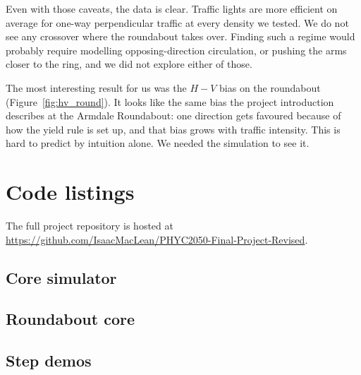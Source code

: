 \documentclass[11pt]{article}
\begin{document}
Even with those caveats, the data is clear. Traffic lights are more efficient on average for one-way perpendicular traffic at every density we tested. We do not see any crossover where the roundabout takes over. Finding such a regime would probably require modelling opposing-direction circulation, or pushing the arms closer to the ring, and we did not explore either of those.

The most interesting result for us was the $H - V$ bias on the roundabout (Figure~\ref{fig:hv_round}). It looks like the same bias the project introduction describes at the Armdale Roundabout: one direction gets favoured because of how the yield rule is set up, and that bias grows with traffic intensity. This is hard to predict by intuition alone. We needed the simulation to see it.

\appendix
\section{Code listings}\label{sec:appendix-code}

The full project repository is hosted at\\
\url{https://github.com/IsaacMacLean/PHYC2050-Final-Project-Revised}.

\subsection{Core simulator}


\subsection{Roundabout core}


\subsection{Step demos}




\end{document}
